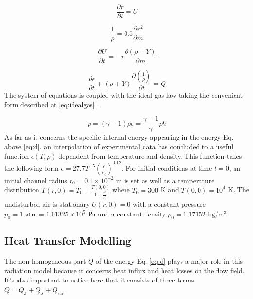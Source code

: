 \documentclass{warpdoc}
\begin{document}
\begin{equation}
      \frac{{\partial}r}{\partial t}=U \label{eq:a}
\end{equation}
 
\begin{equation}
    \frac{1}{\rho}=0.5 \frac{{\partial} {r}^2}{\partial m}\label{eq:b}
\end{equation}

\begin{equation}
    \frac{{\partial}U}{\partial t}=-r\frac{{\partial}(\rho+Y)}{\partial m}\label{eq:c}
\end{equation}

\begin{equation}
  \frac{{\partial}\epsilon}{\partial t}+(\rho+Y)\frac{{\partial}\left(\frac{1}{\rho}\right)}{\partial t}=Q  \label{eq:d}
\end{equation}
The system of equations is coupled with the ideal gas law taking the convenient form described at \eqref{eq:idealgas}  .

\begin{equation}
    p=(\gamma-1)\rho\epsilon=\frac{\gamma-1}{\gamma}\rho h\label{eq:idealgas} 
\end{equation}
As far as it concerns the specific internal energy appearing in the energy Eq. above \eqref{eq:d}, an interpolation of experimental data has concluded to a useful function $\epsilon(T,\rho)$ dependent from temperature and density. This function takes the following form $\epsilon=27.7T^{1.5}\left(\frac{\rho}{\rho_0}\right)^{0.12}$. For initial conditions at time $t=0$, an initial channel radius $r_0=0.1\times10^{-2}$ m is set as well as a temperature distribution $T(r,0)=T_0+\frac{T(0,0)}{1+\frac{r^2}{r_0^2}}$ where $T_0=300$ K and $T(0,0)=10^4$ K. The undisturbed air is stationary $U(r,0)=0$ with a constant pressure $p_0=1\text{ atm}=1.01325\times10^5$ Pa and a constant density  $\rho_0=1.17152\text{ kg}/\text{m}^3$.

\subsection{Heat Transfer Modelling}
The non homogeneous part $Q$ of the energy Eq. \eqref{eq:d} plays a major role in this radiation model because it concerns heat influx and heat losses on the flow field. It's also important to notice here that it consists of three terms $ Q=Q_\text{J}+Q_{\lambda}+Q_\text{rad}$. 
\end{document}
